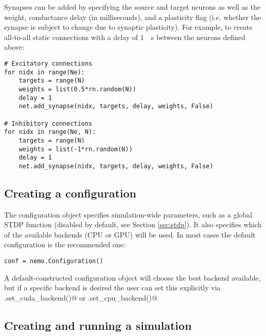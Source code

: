 \documentclass[a4paper]{article}
\newenvironment{mintframe}
  {\begin{mdframed}[linecolor=black, topline=true, bottomline=true,
    leftline=false, rightline=false, backgroundcolor=yellow!13!white,
    nobreak=true]
  }{
  \end{mdframed}
}
\begin{document}
Synapses can be added by specifying the source and target neurons as well as
the weight, conductance delay (in milliseconds), and a plasticity flag (i.e.
whether the synapse is subject to change due to synaptic plasticity). For
example, to create all-to-all static connections with a delay of \SI{1}{\milli
\second} between the neurons defined above:

\begin{mintframe}
\begin{verbatim}
# Excitatory connections
for nidx in range(Ne):
    targets = range(N)
    weights = list(0.5*rn.random(N))
    delay = 1
    net.add_synapse(nidx, targets, delay, weights, False)

# Inhibitory connections
for nidx in range(Ne, N):
    targets = range(N)
    weights = list(-1*rn.random(N))
    delay = 1
    net.add_synapse(nidx, targets, delay, weights, False)
\end{verbatim}
\end{mintframe}

\subsection{Creating a configuration}

The configuration object specifies simulation-wide parameters, such as a global
STDP function (disabled by default, see Section \ref{sec:stdp}). It also
specifies which of the available backends (CPU or GPU) will be used. In most
cases the default configuration is the recommended one:


\begin{mintframe}
\begin{verbatim}
conf = nemo.Configuration()
\end{verbatim}
\end{mintframe}

A default-constructed configuration object will choose the best backend
available, but if a specific backend is desired the user can set this
explicitly via \verb@conf.set_cuda_backend()@ or \verb@conf.set_cpu_backend()@.

\subsection{Creating and running a simulation}
\end{document}
